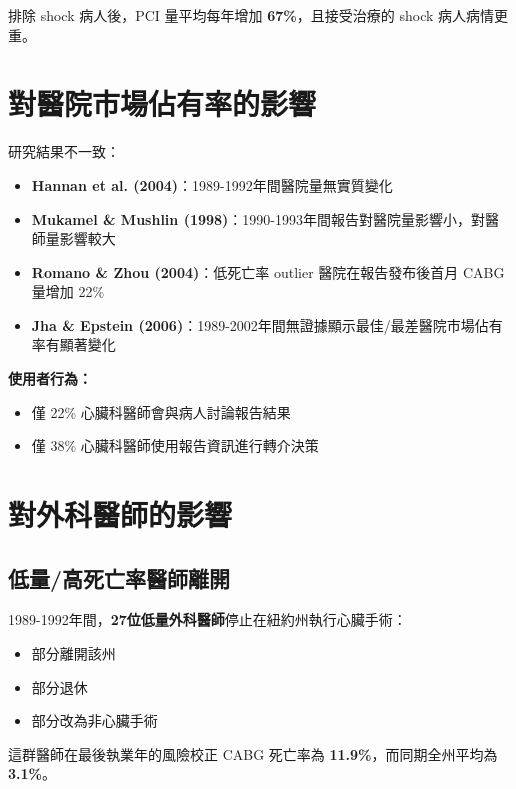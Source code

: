 \documentclass[12pt,a4paper]{article}
\begin{document}
排除 shock 病人後，PCI 量平均每年增加 \textbf{67\%}，且接受治療的 shock 病人病情更重。

\section{對醫院市場佔有率的影響}

研究結果不一致：
\begin{itemize}
    \item \textbf{Hannan et al. (2004)}：1989-1992年間醫院量無實質變化
    \item \textbf{Mukamel \& Mushlin (1998)}：1990-1993年間報告對醫院量影響小，對醫師量影響較大
    \item \textbf{Romano \& Zhou (2004)}：低死亡率 outlier 醫院在報告發布後首月 CABG 量增加 22\%
    \item \textbf{Jha \& Epstein (2006)}：1989-2002年間無證據顯示最佳/最差醫院市場佔有率有顯著變化
\end{itemize}

\textbf{使用者行為：}
\begin{itemize}
    \item 僅 22\% 心臟科醫師會與病人討論報告結果
    \item 僅 38\% 心臟科醫師使用報告資訊進行轉介決策
\end{itemize}

\section{對外科醫師的影響}

\subsection{低量/高死亡率醫師離開}

1989-1992年間，\textbf{27位低量外科醫師}停止在紐約州執行心臟手術：
\begin{itemize}
    \item 部分離開該州
    \item 部分退休
    \item 部分改為非心臟手術
\end{itemize}

這群醫師在最後執業年的風險校正 CABG 死亡率為 \textbf{11.9\%}，而同期全州平均為 \textbf{3.1\%}。
\end{document}
